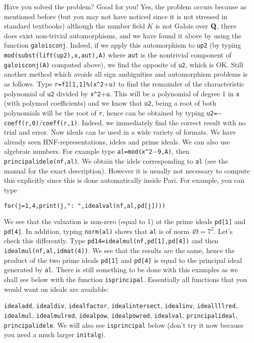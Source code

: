 Have you solved the problem? Good for you! Yes, the problem occurs because
as mentioned before (but you may not have noticed since it is not stressed
in standard textbooks) although the number field $K$ is not Galois over
${\bf Q}$, there does exist non-trivial automorphisms, and we have found it
above by using the function {\tt galoisconj}. Indeed, if we apply this
automorphism to {\tt up2} (by typing {\tt mod(subst(lift(up2),x,aut),A)}
where {\tt aut} is the nontrivial component of {\tt galoisconj(A)}
computed above), we find the opposite of {\tt u2}, which is OK.
\smallskip
Still another method which avoids all sign ambiguities and automorphism
problems is as follows. Type {\tt r=f1[1,1]\%(x\^{}2$+$u)} to find the remainder
of the characteristic polynomial of {\tt u2} divided by {\tt x\^{}2$+$u}.
This will be a polynomial of degree 1 in {\tt x} (with polymod coefficients)
and we know that {\tt u2}, being a root of both polynomials will be the
root of {\tt r}, hence can be obtained by typing 
{\tt u2=$-$coeff(r,0)$/$coeff(r,1)}. Indeed, we immediately find the
correct result with no trial and error.
\smallskip
Now ideals can be used in a wide variety of formats. We have already seen
HNF-representations, ideles and prime ideals. We can also use algebraic
numbers. For example type {\tt al=mod(x\^{}2$-$9,A)}, then 
{\tt principalidele(nf,al)}. We obtain the idele corresponding to {\tt al}
(see the manual for the exact description). However it is usually not necessary
to compute this explicitly since this is done automatically inside Pari.
For example, you can type

\centerline{\tt for(j=1,4,print(j,": ",idealval(nf,al,pd[j])))}

We see that the valuation is non-zero (equal to 1) at the prime ideals 
{\tt pd[1]} and {\tt pd[4]}. In addition, typing {\tt norm(al)} shows that
{\tt al} is of norm $49=7^2$. Let's check this differently. Type 
{\tt pd14=idealmul(nf,pd[1],pd[4])} and then {\tt idealmul(nf,al,idmat(4))}.
We see that the results are the same, hence the product of the two prime
ideals {\tt pd[1]} and {\tt pd[4]} is equal to the principal ideal generated
by {\tt al}. There is still something to be done with this examples as we
shall see below with the function {\tt isprincipal}.
Essentially all functions that you would want on ideals are available:

{\tt idealadd}, {\tt idealdiv}, {\tt idealfactor}, {\tt idealintersect},
{\tt idealinv}, {\tt ideallllred}, {\tt idealmul}, {\tt idealmulred},
{\tt idealpow}, {\tt idealpowred}, {\tt idealval}, {\tt principalideal}, 
{\tt principalidele}. We will also see {\tt isprincipal} below (don't try
it now because you need a much larger {\tt initalg}).

